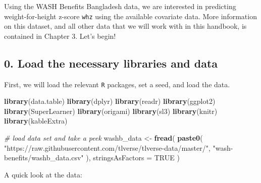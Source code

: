 \documentclass[12pt, krantz2,]{book}
\newenvironment{Shaded}{\begin{snugshade}}{\end{snugshade}}
\newcommand{\CommentTok}[1]{\textcolor[rgb]{0.56,0.35,0.01}{\textit{#1}}}
\newcommand{\DataTypeTok}[1]{\textcolor[rgb]{0.13,0.29,0.53}{#1}}
\newcommand{\KeywordTok}[1]{\textcolor[rgb]{0.13,0.29,0.53}{\textbf{#1}}}
\newcommand{\NormalTok}[1]{#1}
\newcommand{\OtherTok}[1]{\textcolor[rgb]{0.56,0.35,0.01}{#1}}
\newcommand{\StringTok}[1]{\textcolor[rgb]{0.31,0.60,0.02}{#1}}
\theoremstyle{definition}
\theoremstyle{definition}
\theoremstyle{definition}
\newcommand{\1}{\mathbbm{1}}
\begin{document}
Using the WASH Benefits Bangladesh data, we are interested in predicting
weight-for-height z-score \texttt{whz} using the available covariate data. More
information on this dataset, and all other data that we will work with in this
handbook, is contained in \protect\hypertarget{data}{}{Chapter 3}. Let's begin!

\hypertarget{load-the-necessary-libraries-and-data}{%
\subsection*{0. Load the necessary libraries and data}\label{load-the-necessary-libraries-and-data}}


First, we will load the relevant \texttt{R} packages, set a seed, and load the data.

\begin{Shaded}
\begin{Highlighting}[]
\KeywordTok{library}\NormalTok{(data.table)}
\KeywordTok{library}\NormalTok{(dplyr)}
\KeywordTok{library}\NormalTok{(readr)}
\KeywordTok{library}\NormalTok{(ggplot2)}
\KeywordTok{library}\NormalTok{(SuperLearner)}
\KeywordTok{library}\NormalTok{(origami)}
\KeywordTok{library}\NormalTok{(sl3)}
\KeywordTok{library}\NormalTok{(knitr)}
\KeywordTok{library}\NormalTok{(kableExtra)}

\CommentTok{# load data set and take a peek}
\NormalTok{washb_data <-}\StringTok{ }\KeywordTok{fread}\NormalTok{(}
  \KeywordTok{paste0}\NormalTok{(}
    \StringTok{"https://raw.githubusercontent.com/tlverse/tlverse-data/master/"}\NormalTok{,}
    \StringTok{"wash-benefits/washb_data.csv"}
\NormalTok{  ),}
  \DataTypeTok{stringsAsFactors =} \OtherTok{TRUE}
\NormalTok{)}
\end{Highlighting}
\end{Shaded}

A quick look at the data:
\end{document}
